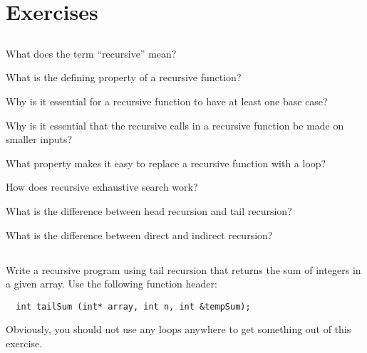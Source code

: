 \section{Exercises}

\subsection{\ReviewQuestions}

\begin{exercise}
  What does the term ``recursive'' mean?
\end{exercise}

\begin{exercise}
  What is the defining property of a recursive function?
\end{exercise}

\begin{exercise}
  Why is it essential for a recursive function to have at least one
  base case?
\end{exercise}

\begin{exercise}
  Why is it essential that the recursive calls in a recursive function
  be made on smaller inputs?
\end{exercise}

\begin{exercise}
  What property makes it easy to replace a recursive function with a
  loop?
\end{exercise}

\begin{exercise}
  How does recursive exhaustive search work?
\end{exercise}

\begin{exercise}
  What is the difference between head recursion and tail recursion?
\end{exercise}

\begin{exercise}
  What is the difference between direct and indirect recursion?
\end{exercise}

\subsection{\EasyQuestions}
\begin{exercise}
  Write a recursive program using tail recursion
  that returns the sum of integers in a given array.
  Use the following function header:

\begin{verbatim}
  int tailSum (int* array, int n, int &tempSum);
\end{verbatim}
  Obviously, you should not use any loops anywhere to get something
  out of this exercise.
\end{exercise}

